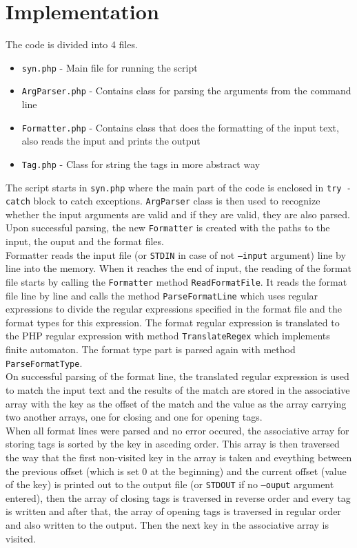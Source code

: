 \documentclass[12pt,a4paper,final]{article}
\begin{document}
\section{Implementation}
The code is divided into 4 files.
\begin{itemize}
\item \texttt{syn.php} - Main file for running the script
\item \texttt{ArgParser.php} - Contains class for parsing the arguments from the command line
\item \texttt{Formatter.php} - Contains class that does the formatting of the input text, also reads the input and prints the output
\item \texttt{Tag.php} - Class for string the tags in more abstract way
\end{itemize}
The script starts in \texttt{syn.php} where the main part of the code is enclosed in \texttt{try - catch} block to catch exceptions. \texttt{ArgParser} class is then used to recognize whether the input arguments are valid and if they are valid, they are also parsed. Upon successful parsing, the new \texttt{Formatter} is created with the paths to the input, the ouput and the format files. \\
\newline
Formatter reads the input file (or \texttt{STDIN} in case of not \texttt{--input} argument) line by line into the memory. When it reaches the end of input, the reading of the format file starts by calling the \texttt{Formatter} method \texttt{ReadFormatFile}. It reads the format file line by line and calls the method \texttt{ParseFormatLine} which uses regular expressions to divide the regular expressions specified in the format file and the format types for this expression. The format regular expression is translated to the PHP regular expression with method \texttt{TranslateRegex} which implements finite automaton. The format type part is parsed again with method \texttt{ParseFormatType}. \\
\newline
On successful parsing of the format line, the translated regular expression is used to match the input text and the results of the match are stored in the associative array with the key as the offset of the match and the value as the array carrying two another arrays, one for closing and one for opening tags. \\
\newline
When all format lines were parsed and no error occured, the associative array for storing tags is sorted by the key in asceding order. This array is then traversed the way that the first non-visited key in the array is taken and eveything between the previous offset (which is set 0 at the beginning) and the current offset (value of the key) is printed out to the output file (or \texttt{STDOUT} if no \texttt{--ouput} argument entered), then the array of closing tags is traversed in reverse order and every tag is written and after that, the array of opening tags is traversed in regular order and also written to the output. Then the next key in the associative array is visited.
\end{document}
